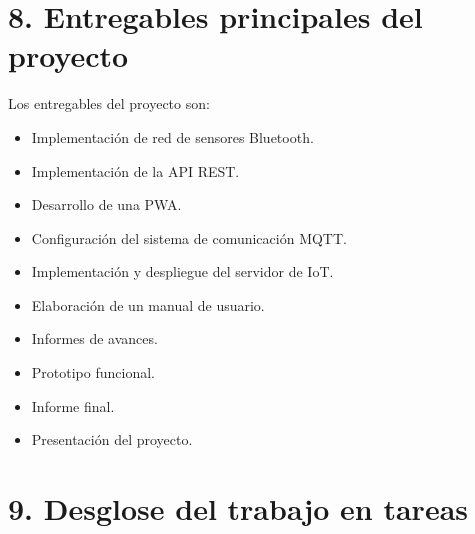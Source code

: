 \documentclass[
11pt, %
]{charter}
\begin{document}
\section{8. Entregables principales del proyecto}
\label{sec:entregables}


Los entregables del proyecto son:

\begin{itemize}
	\item Implementación de red de sensores Bluetooth.
	\item Implementación de la API REST.
	\item Desarrollo de una PWA.
	\item Configuración del sistema de comunicación MQTT.
	\item Implementación y despliegue del servidor de IoT.
	\item Elaboración de un manual de usuario.
	\item Informes de avances.
	\item Prototipo funcional.
	\item Informe final.
	\item Presentación del proyecto.
\end{itemize}



\section{9. Desglose del trabajo en tareas}
\label{sec:wbs}
\end{document}
